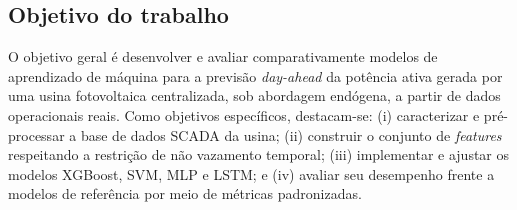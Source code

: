 \subsection{Objetivo do trabalho}

O objetivo geral é desenvolver e avaliar comparativamente modelos de aprendizado de máquina para a previsão \textit{day-ahead} da potência ativa gerada por uma usina fotovoltaica centralizada, sob abordagem endógena, a partir de dados operacionais reais. Como objetivos específicos, destacam-se: (i) caracterizar e pré-processar a base de dados SCADA da usina; (ii) construir o conjunto de \textit{features} respeitando a restrição de não vazamento temporal; (iii) implementar e ajustar os modelos XGBoost, SVM, MLP e LSTM; e (iv) avaliar seu desempenho frente a modelos de referência por meio de métricas padronizadas.